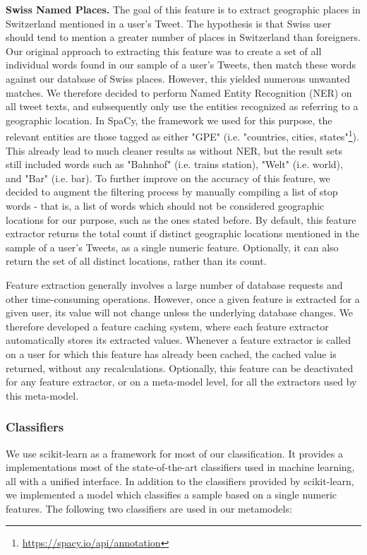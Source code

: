 \documentclass[10pt,a4paper]{article}
\begin{document}
\textbf{Swiss Named Places.} The goal of this feature is to extract geographic places in Switzerland mentioned in a user's Tweet. The hypothesis is that Swiss user should tend to mention a greater number of places in Switzerland than foreigners. Our original approach to extracting this feature was to create a set of all individual words found in our sample of a user's Tweets, then match these words against our database of Swiss places. However, this yielded numerous unwanted matches. We therefore decided to perform Named Entity Recognition (NER) on all tweet texts, and subsequently only use the entities recognized as referring to a geographic location. In SpaCy, the framework we used for this purpose, the relevant entities are those tagged as either  "GPE" (i.e. "countries, cities, states"\footnote{\href{https://spacy.io/api/annotation}{https://spacy.io/api/annotation}}). This already lead to much cleaner results as without NER, but the result sets still included words such as "Bahnhof" (i.e. trains station), "Welt" (i.e. world), and "Bar" (i.e. bar). To further improve on the accuracy of this feature, we decided to augment the filtering process by manually compiling a list of stop words - that is, a list of words which should not be considered geographic locations for our purpose, such as the ones stated before. By default, this feature extractor returns the total count if distinct geographic locations mentioned in the sample of a user's Tweets, as a single numeric feature. Optionally, it can also return the set of all distinct locations, rather than its count.

Feature extraction generally involves a large number of database requests and other time-consuming operations. However, once a given feature is extracted for a given user, its value will not change unless the underlying database changes. We therefore developed a feature caching system, where each feature extractor automatically stores its extracted values. Whenever a feature extractor is called on a user for which this feature has already been cached, the cached value is returned, without any recalculations. Optionally, this feature can be deactivated for any feature extractor, or on a meta-model level, for all the extractors used by this meta-model.

\subsubsection{Classifiers}
We use scikit-learn as a framework for most of our classification. It provides a implementations most of the state-of-the-art classifiers used in machine learning, all with a unified interface. In addition to the classifiers provided by scikit-learn, we implemented a model which classifies a sample based on a single numeric features. The following two classifiers are used in our metamodels:
\end{document}
